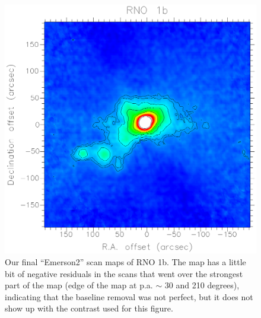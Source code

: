 \documentclass[twoside,11pt]{article}
\renewcommand{\_}{\texttt{\symbol{95}}}
\begin{document}
\begin{figure}
\begin{center}
\includegraphics[width=\textwidth]{sho_fig7.eps}
\caption{Our final ``Emerson2'' scan maps of RNO 1b. The map has a
little bit of negative residuals in the scans that went over the
strongest part of the map (edge of the map at p.a. $\sim$ 30 and 210 degrees),
indicating that the baseline removal was not perfect, but it does not
show up with the contrast used for this figure.} 
\label{fig:final}
\end{center}
\end{figure}
\end{document}
